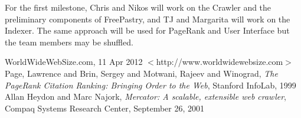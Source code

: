 \documentclass[11pt, letterpaper, oneside, twocolumn]{article}
\begin{document}
For the first milestone, Chris and Nikos will work on the Crawler and the preliminary components of FreePastry, and TJ and Margarita will work on the Indexer. The same approach will be used for PageRank and User Interface but the team members may be shuffled.

\begin{thebibliography}{9}

   WorldWideWebSize.com, 11 Apr 2012 $<$http://www.worldwidewebsize.com$>$
   Page, Lawrence and Brin, Sergey and Motwani, Rajeev and Winograd, \emph{The PageRank Citation Ranking: Bringing Order to the Web}, Stanford InfoLab, 1999
   Allan Heydon and Marc Najork, \emph{Mercator: A scalable, extensible web crawler}, Compaq Systems Research Center, September 26, 2001


\end{thebibliography}
\end{document}
